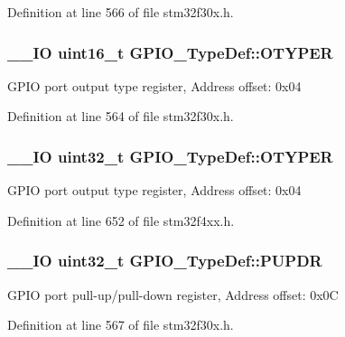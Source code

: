 Definition at line 566 of file stm32f30x.\-h.

\hypertarget{struct_g_p_i_o___type_def_a4c441e20e7dcea37e648e6e8f1eda862}{
\subsubsection[{O\-T\-Y\-P\-E\-R}]{\setlength{\rightskip}{0pt plus 5cm}\-\_\-\-\_\-\-I\-O {\bf uint16\-\_\-t} G\-P\-I\-O\-\_\-\-Type\-Def\-::\-O\-T\-Y\-P\-E\-R}}\label{struct_g_p_i_o___type_def_a4c441e20e7dcea37e648e6e8f1eda862}
G\-P\-I\-O port output type register, Address offset\-: 0x04 

Definition at line 564 of file stm32f30x.\-h.

\hypertarget{struct_g_p_i_o___type_def_a910885e4d881c3a459dd11640237107f}{
\subsubsection[{O\-T\-Y\-P\-E\-R}]{\setlength{\rightskip}{0pt plus 5cm}\-\_\-\-\_\-\-I\-O {\bf uint32\-\_\-t} G\-P\-I\-O\-\_\-\-Type\-Def\-::\-O\-T\-Y\-P\-E\-R}}\label{struct_g_p_i_o___type_def_a910885e4d881c3a459dd11640237107f}
G\-P\-I\-O port output type register, Address offset\-: 0x04 

Definition at line 652 of file stm32f4xx.\-h.

\hypertarget{struct_g_p_i_o___type_def_a44ada3bfbe891e2efc1e06bda4c8014e}{
\subsubsection[{P\-U\-P\-D\-R}]{\setlength{\rightskip}{0pt plus 5cm}\-\_\-\-\_\-\-I\-O {\bf uint32\-\_\-t} G\-P\-I\-O\-\_\-\-Type\-Def\-::\-P\-U\-P\-D\-R}}\label{struct_g_p_i_o___type_def_a44ada3bfbe891e2efc1e06bda4c8014e}
G\-P\-I\-O port pull-\/up/pull-\/down register, Address offset\-: 0x0\-C 

Definition at line 567 of file stm32f30x.\-h.

